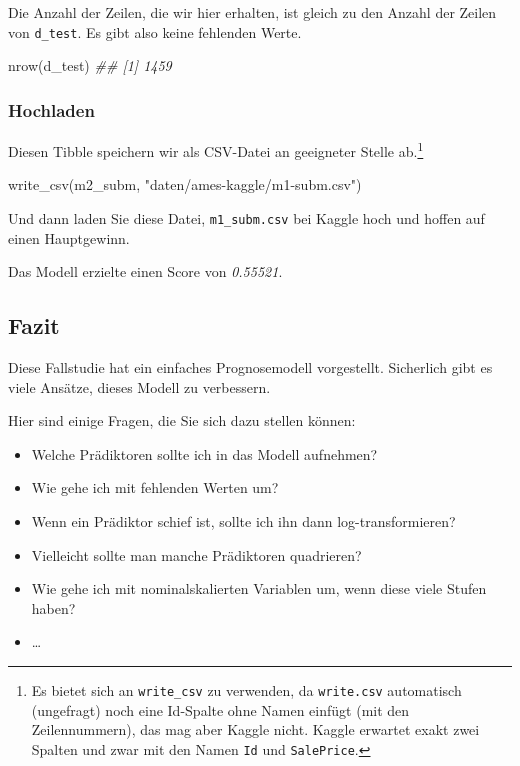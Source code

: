 \documentclass[
  letterpaper,
]{scrbook}
\newenvironment{Shaded}{\begin{snugshade}}{\end{snugshade}}
\newcommand{\DocumentationTok}[1]{\textcolor[rgb]{0.37,0.37,0.37}{\textit{#1}}}
\newcommand{\FunctionTok}[1]{\textcolor[rgb]{0.28,0.35,0.67}{#1}}
\newcommand{\NormalTok}[1]{\textcolor[rgb]{0.00,0.23,0.31}{#1}}
\newcommand{\StringTok}[1]{\textcolor[rgb]{0.13,0.47,0.30}{#1}}
\providecommand{\tightlist}{%
  \setlength{\itemsep}{0pt}\setlength{\parskip}{0pt}}\usepackage{longtable,booktabs,array}
\theoremstyle{definition}
\theoremstyle{definition}
\theoremstyle{definition}
\theoremstyle{remark}
\begin{document}
Die Anzahl der Zeilen, die wir hier erhalten, ist gleich zu den Anzahl
der Zeilen von \texttt{d\_test}. Es gibt also keine fehlenden Werte.

\begin{Shaded}
\begin{Highlighting}[]
\FunctionTok{nrow}\NormalTok{(d\_test)}
\DocumentationTok{\#\# [1] 1459}
\end{Highlighting}
\end{Shaded}

\subsubsection{Hochladen}\label{hochladen}

Diesen Tibble speichern wir als CSV-Datei an geeigneter Stelle
ab.\footnote{Es bietet sich an \texttt{write\_csv} zu verwenden, da
  \texttt{write.csv} automatisch (ungefragt) noch eine Id-Spalte ohne
  Namen einfügt (mit den Zeilennummern), das mag aber Kaggle nicht.
  Kaggle erwartet exakt zwei Spalten und zwar mit den Namen \texttt{Id}
  und \texttt{SalePrice}.}

\begin{Shaded}
\begin{Highlighting}[]
\FunctionTok{write\_csv}\NormalTok{(m2\_subm, }\StringTok{"daten/ames{-}kaggle/m1{-}subm.csv"}\NormalTok{)}
\end{Highlighting}
\end{Shaded}

Und dann laden Sie diese Datei, \texttt{m1\_subm.csv} bei Kaggle hoch
und hoffen auf einen Hauptgewinn.

Das Modell erzielte einen Score von \emph{0.55521}.

\subsection{Fazit}\label{fazit-3}

Diese Fallstudie hat ein einfaches Prognosemodell vorgestellt.
Sicherlich gibt es viele Ansätze, dieses Modell zu verbessern.

Hier sind einige Fragen, die Sie sich dazu stellen können:

\begin{itemize}
\tightlist
\item
  Welche Prädiktoren sollte ich in das Modell aufnehmen?
\item
  Wie gehe ich mit fehlenden Werten um?
\item
  Wenn ein Prädiktor schief ist, sollte ich ihn dann log-transformieren?
\item
  Vielleicht sollte man manche Prädiktoren quadrieren?
\item
  Wie gehe ich mit nominalskalierten Variablen um, wenn diese viele
  Stufen haben?
\item
  \ldots{}
\end{itemize}
\end{document}
